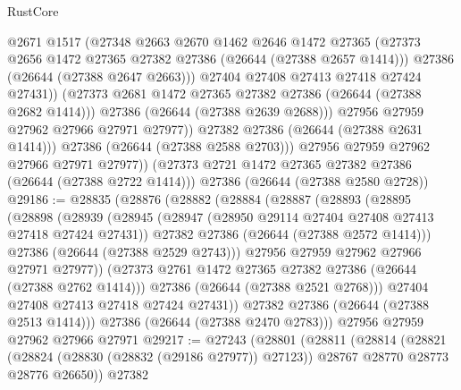 \begin{lexlean}{RustCore}
\begin{coremodule}
                      @2671
                      @1517
                      (@27348
                        @2663
                        @2670
                        @1462
                        @2646
                        @1472
                        @27365
                        (@27373 @2656 @1472 @27365 @27382 @27386 (@26644 (@27388 @2657 @1414)))
                        @27386
                        (@26644 (@27388 @2647 @2663)))
                      @27404
                      @27408
                      @27413
                      @27418
                      @27424
                      @27431))
                  (@27373 @2681 @1472 @27365 @27382 @27386 (@26644 (@27388 @2682 @1414)))
                  @27386
                  (@26644 (@27388 @2639 @2688)))
                @27956
                @27959
                @27962
                @27966
                @27971
                @27977))
            @27382
            @27386
            (@26644 (@27388 @2631 @1414)))
          @27386
          (@26644 (@27388 @2588 @2703)))
        @27956
        @27959
        @27962
        @27966
        @27971
        @27977))
    (@27373 @2721 @1472 @27365 @27382 @27386 (@26644 (@27388 @2722 @1414)))
    @27386
    (@26644 (@27388 @2580 @2728))
@29186 := @28835
    (@28876
      (@28882
        (@28884
          (@28887
            (@28893
              (@28895
                (@28898
                  (@28939
                    (@28945
                      (@28947 (@28950 @29114 @27404 @27408 @27413 @27418 @27424 @27431))
                      @27382
                      @27386
                      (@26644 (@27388 @2572 @1414)))
                    @27386
                    (@26644 (@27388 @2529 @2743)))
                  @27956
                  @27959
                  @27962
                  @27966
                  @27971
                  @27977))
              (@27373 @2761 @1472 @27365 @27382 @27386 (@26644 (@27388 @2762 @1414)))
              @27386
              (@26644 (@27388 @2521 @2768)))
            @27404
            @27408
            @27413
            @27418
            @27424
            @27431))
        @27382
        @27386
        (@26644 (@27388 @2513 @1414)))
      @27386
      (@26644 (@27388 @2470 @2783)))
    @27956
    @27959
    @27962
    @27966
    @27971
@29217 := @27243
    (@28801
      (@28811
        (@28814
          (@28821
            (@28824 (@28830 (@28832 (@29186 @27977)) @27123))
            @28767
            @28770
            @28773
            @28776
            @26650))
        @27382

\end{coremodule}
\end{lexlean}
